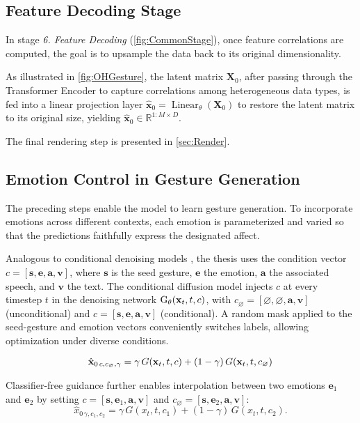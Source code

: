 \subsection{Feature Decoding Stage}

In stage \textit{6. Feature Decoding} (\autoref{fig:CommonStage}), once feature correlations are computed, the goal is to upsample the data back to its original dimensionality.

As illustrated in \autoref{fig:OHGesture}, the latent matrix $\mathbf{X}_{0}$, after passing through the Transformer Encoder to capture correlations among heterogeneous data types, is fed into a linear projection layer
$\hat{\mathbf{x}}_{0} = \operatorname{Linear}_{\theta}(\mathbf{X}_{0})$
to restore the latent matrix to its original size, yielding $\hat{\mathbf{x}}_{0} \in \mathbb{R}^{1:M \times D}$.

The final rendering step is presented in \autoref{sec:Render}.

\subsection{Emotion Control in Gesture Generation}

The preceding steps enable the model to learn gesture generation. To incorporate emotions across different contexts, each emotion is parameterized and varied so that the predictions faithfully express the designated affect.

Analogous to conditional denoising models \cite{ho2022classifier, tevet2022human}, the thesis uses the condition vector
$c = [\mathbf{s}, \mathbf{e}, \mathbf{a}, \mathbf{v}]$,  
where $\mathbf{s}$ is the seed gesture, $\mathbf{e}$ the emotion, $\mathbf{a}$ the associated speech, and $\mathbf{v}$ the text.
The conditional diffusion model injects $c$ at every timestep $t$ in the denoising network $\text{G}_\theta(\mathbf{x}_{t}, t, c)$, with
$c_{\varnothing} = [\varnothing, \varnothing, \mathbf{a}, \mathbf{v}]$ (unconditional)
and $c = [\mathbf{s}, \mathbf{e}, \mathbf{a}, \mathbf{v}]$ (conditional).
A random mask applied to the seed-gesture and emotion vectors conveniently switches labels, allowing optimization under diverse conditions.

\begin{equation} \label{eq:denoise}
\hat{\mathbf{x}}_{0\,c,c_{\varnothing},\gamma}
    = \gamma\, G(\mathbf{x}_{t}, t, c) + (1-\gamma)\, G(\mathbf{x}_{t}, t, c_{\varnothing})
\end{equation}

Classifier-free guidance \cite{ho2022classifier} further enables interpolation between two emotions
$\mathbf{e}_1$ and $\mathbf{e}_2$ by setting
$c = [\mathbf{s}, \mathbf{e}_{1}, \mathbf{a}, \mathbf{v}]$ and
$c_{\varnothing} = [\mathbf{s}, \mathbf{e}_{2}, \mathbf{a}, \mathbf{v}]$:
\[
\hat{x}_{0\,\gamma, c_{1}, c_{2}}
    = \gamma\, G(x_{t}, t, c_{1}) + (1-\gamma)\, G(x_{t}, t, c_{2}).
\]

